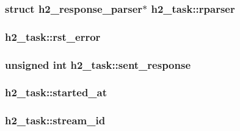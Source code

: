 \subsubsection[{\texorpdfstring{rparser}{rparser}}]{\setlength{\rightskip}{0pt plus 5cm}struct {\bf h2\+\_\+response\+\_\+parser}$\ast$ h2\+\_\+task\+::rparser}\hypertarget{structh2__task_a5e084710fc474d46f4033d7600eb9443}{}\label{structh2__task_a5e084710fc474d46f4033d7600eb9443}
\subsubsection[{\texorpdfstring{rst\+\_\+error}{rst_error}}]{ h2\+\_\+task\+::rst\+\_\+error}\hypertarget{structh2__task_a49f5715c5fc92dae7bbd564f64086eb4}{}\label{structh2__task_a49f5715c5fc92dae7bbd564f64086eb4}
\subsubsection[{\texorpdfstring{sent\+\_\+response}{sent_response}}]{\setlength{\rightskip}{0pt plus 5cm}unsigned {\bf int} h2\+\_\+task\+::sent\+\_\+response}\hypertarget{structh2__task_a747d4493551a9e0d1da76a22cbc5c45a}{}\label{structh2__task_a747d4493551a9e0d1da76a22cbc5c45a}
\subsubsection[{\texorpdfstring{started\+\_\+at}{started_at}}]{ h2\+\_\+task\+::started\+\_\+at}\hypertarget{structh2__task_a014791f4fee83070c1b8b52806ce3502}{}\label{structh2__task_a014791f4fee83070c1b8b52806ce3502}
\subsubsection[{\texorpdfstring{stream\+\_\+id}{stream_id}}]{ h2\+\_\+task\+::stream\+\_\+id}\hypertarget{structh2__task_a09e7e9f9e5fdb61206c344f2272d9f20}{}\label{structh2__task_a09e7e9f9e5fdb61206c344f2272d9f20}
